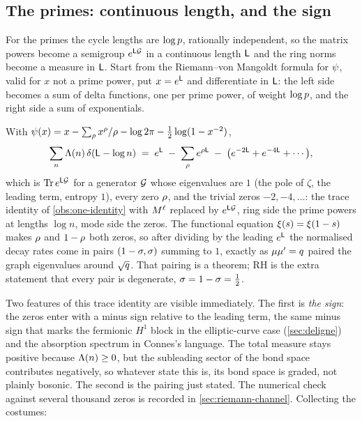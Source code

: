 \subsection{The primes: continuous length, and the sign}

For the primes the cycle lengths are $\log p$, rationally independent, so the matrix
powers become a semigroup $e^{\mathsf L\mathcal G}$ in a continuous length $\mathsf L$ and
the ring norms become a measure in $\mathsf L$. Start from the Riemann--von Mangoldt
formula for $\psi$, valid for $x$ not a prime power, put $x = e^{\mathsf L}$ and
differentiate in $\mathsf L$: the left side becomes a sum of delta functions, one per
prime power, of weight $\log p$, and the right side a sum of exponentials.

\begin{observation}
\label{obs:rh-flow-pairing}
With $\psi(x) = x - \sum_{\rho}x^{\rho}/\rho - \log2\pi - \tfrac12\log(1-x^{-2})$,
\[
\sum_n \Lambda(n)\,\delta(\mathsf L-\log n) \;=\; e^{\mathsf L}
\;-\; \sum_{\rho}e^{\rho\mathsf L}
\;-\; \big(e^{-2\mathsf L}+e^{-4\mathsf L}+\cdots\big),
\]
which is $\operatorname{Tr} e^{\mathsf L\mathcal G}$ for a generator $\mathcal G$ whose eigenvalues are
$1$ (the pole of $\zeta$, the leading term, entropy $1$), every zero $\rho$, and the
trivial zeros $-2,-4,\dots$: the trace identity of \cref{obs:one-identity} with $M^{\ell}$
replaced by $e^{\mathsf L\mathcal G}$, ring side the prime powers at lengths $\log n$,
mode side the zeros. The functional equation $\xi(s) = \xi(1-s)$ makes $\rho$ and
$1-\rho$ both zeros, so after dividing by the leading $e^{\mathsf L}$ the normalised
decay rates come in pairs $(1-\sigma,\sigma)$ summing to $1$, exactly as
$\mu\mu' = q$ paired the graph eigenvalues around $\sqrt{q}$. That pairing
is a theorem; RH is the extra statement that every pair is degenerate, $\sigma =
1-\sigma = \tfrac12$.
\end{observation}

Two features of this trace identity are visible immediately. The first is \emph{the
sign}: the zeros enter with a minus sign relative to the leading term, the same minus
sign that marks the fermionic $H^1$ block in the elliptic-curve case
(\cref{sec:deligne}) and the absorption spectrum in Connes's language. The total
measure stays positive because $\Lambda(n)\ge0$, but the subleading sector of the bond
space contributes negatively, so whatever state this is, its bond space is graded, not
plainly bosonic. The second is the pairing just stated. The numerical check against
several thousand zeros is recorded in \cref{sec:riemann-channel}. Collecting the
costumes:

